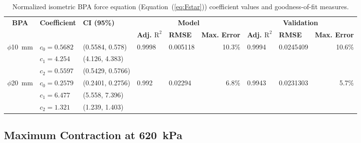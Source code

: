 \begin{table}
\vspace{1.5em}
\caption{Normalized isometric BPA force equation (Equation~(\ref{eq:Fstar})) coefficient values and goodness-of-fit measures.}
\label{tab:Fstar}
\begin{tabular}{@{}cllrrrrrr@{}}
\toprule
\multirow{2}{*}{\textbf{BPA}} &
  \multirow{2}{*}{\textbf{Coefficient}} &
  \multirow{2}{*}{\textbf{CI (95\%)}} &
  \multicolumn{3}{c}{\textbf{Model}} &
  \multicolumn{3}{c}{\textbf{Validation}} \\ 
& & &
  \multicolumn{1}{l}{\textbf{Adj. $\text{R}^2$}} &
  \multicolumn{1}{l}{\textbf{RMSE}} &
  \textbf{Max. Error} &
  \multicolumn{1}{l}{\textbf{Adj. $\text{R}^2$}} &
  \multicolumn{1}{l}{\textbf{RMSE}} &
  \textbf{Max. Error} \\ \midrule
\multirow{3}{*}{$\phi$\qty{10}{\mm}} &
  $c_0 = 0.5682$ & (0.5584, 0.578) &
  \multicolumn{1}{l}{\multirow{3}{*}{0.9998}} &
  \multicolumn{1}{l}{\multirow{3}{*}{0.005118}} &
  \multirow{3}{*}{10.3\%} &
  \multicolumn{1}{l}{\multirow{3}{*}{0.9994}} &
  \multicolumn{1}{l}{\multirow{3}{*}{0.0245409}} &
  \multirow{3}{*}{10.6\%} \\ \cmidrule{2-3}
& $c_1 = 4.254$ & (4.126, 4.383) &
  \multicolumn{1}{l}{} & \multicolumn{1}{l}{} & &
  \multicolumn{1}{l}{} & \multicolumn{1}{l}{} & \\ \cmidrule{2-3}
& $c_2 = 0.5597$ & (0.5429, 0.5766) &
  \multicolumn{1}{l}{} & \multicolumn{1}{l}{} & &
  \multicolumn{1}{l}{} & \multicolumn{1}{l}{} & \\ \midrule
\multirow{3}{*}{$\phi$\qty{20}{\mm}} &
  $c_0 = 0.2579$ & (0.2401, 0.2756) &
  \multicolumn{1}{l}{\multirow{3}{*}{0.992}} &
  \multicolumn{1}{l}{\multirow{3}{*}{0.02294}} &
  \multirow{3}{*}{6.8\%} &
  \multicolumn{1}{l}{\multirow{3}{*}{0.9943}} &
  \multicolumn{1}{l}{\multirow{3}{*}{0.0231303}} &
  \multirow{3}{*}{5.7\%} \\ \cmidrule{2-3}
& $c_1 = 6.477$ & (5.558, 7.396) &
  \multicolumn{1}{l}{} & \multicolumn{1}{l}{} & &
  \multicolumn{1}{l}{} & \multicolumn{1}{l}{} & \\ \cmidrule{2-3}
& $c_2 = 1.321$ & (1.239, 1.403) &
\multicolumn{1}{l}{} & \multicolumn{1}{l}{} & &
\multicolumn{1}{l}{} & \multicolumn{1}{l}{} & \\ \bottomrule
\end{tabular}

\endgroup
\end{table}



\subsection{Maximum Contraction at \qty{620}{\kPa}}

